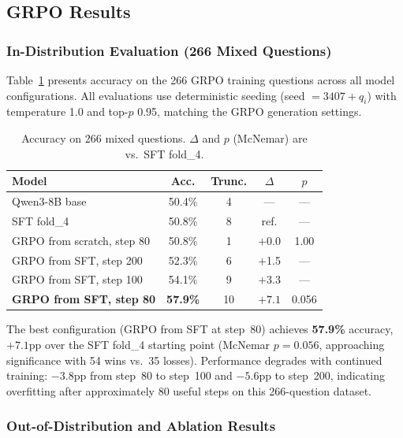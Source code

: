 \subsection{GRPO Results}
\label{sec:grpo:results}

\subsubsection{In-Distribution Evaluation (266 Mixed Questions)}

Table~\ref{tab:grpo_266q} presents accuracy on the 266 GRPO training questions across all model configurations. All evaluations use deterministic seeding (seed $= 3407 + q_i$) with temperature 1.0 and top-$p$ 0.95, matching the GRPO generation settings.

\begin{table}[t]
\centering
\small
\caption{Accuracy on 266 mixed questions. $\Delta$ and $p$ (McNemar) are vs.\ SFT fold\_4.}
\label{tab:grpo_266q}
\begin{tabular}{@{}lcccc@{}}
\toprule
Model & Acc. & Trunc. & $\Delta$ & $p$ \\
\midrule
Qwen3-8B base              & 50.4\% & 4  & --- & --- \\
SFT fold\_4                & 50.8\% & 8  & ref. & --- \\
GRPO from scratch, step 80 & 50.8\% & 1 & $+$0.0 & 1.00 \\
\midrule
GRPO from SFT, step 200    & 52.3\% & 6  & $+$1.5 & --- \\
GRPO from SFT, step 100    & 54.1\% & 9  & $+$3.3 & --- \\
\textbf{GRPO from SFT, step 80} & \textbf{57.9\%} & 10 & $\boldsymbol{+7.1}$ & 0.056 \\
\bottomrule
\end{tabular}
\end{table}

The best configuration (GRPO from SFT at step~80) achieves \textbf{57.9\%} accuracy, $+7.1$pp over the SFT fold\_4 starting point (McNemar $p=0.056$, approaching significance with 54 wins vs.\ 35 losses). Performance degrades with continued training: $-3.8$pp from step~80 to step~100 and $-5.6$pp to step~200, indicating overfitting after approximately 80 useful steps on this 266-question dataset.

\subsubsection{Out-of-Distribution and Ablation Results}

